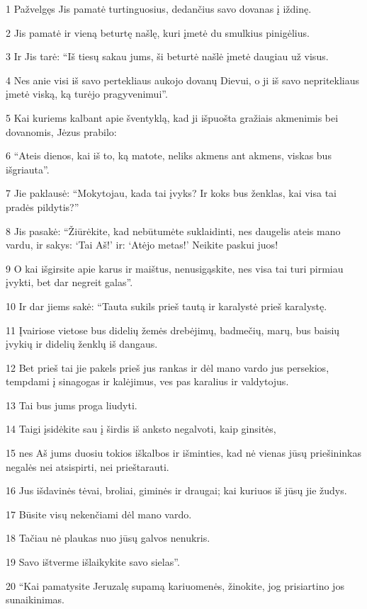 \par 1 Pažvelgęs Jis pamatė turtinguosius, dedančius savo dovanas į iždinę. 
\par 2 Jis pamatė ir vieną beturtę našlę, kuri įmetė du smulkius pinigėlius. 
\par 3 Ir Jis tarė: “Iš tiesų sakau jums, ši beturtė našlė įmetė daugiau už visus. 
\par 4 Nes anie visi iš savo pertekliaus aukojo dovanų Dievui, o ji iš savo nepritekliaus įmetė viską, ką turėjo pragyvenimui”. 
\par 5 Kai kuriems kalbant apie šventyklą, kad ji išpuošta gražiais akmenimis bei dovanomis, Jėzus prabilo: 
\par 6 “Ateis dienos, kai iš to, ką matote, neliks akmens ant akmens, viskas bus išgriauta”. 
\par 7 Jie paklausė: “Mokytojau, kada tai įvyks? Ir koks bus ženklas, kai visa tai pradės pildytis?” 
\par 8 Jis pasakė: “Žiūrėkite, kad nebūtumėte suklaidinti, nes daugelis ateis mano vardu, ir sakys: ‘Tai Aš!’ ir: ‘Atėjo metas!’ Neikite paskui juos! 
\par 9 O kai išgirsite apie karus ir maištus, nenusigąskite, nes visa tai turi pirmiau įvykti, bet dar negreit galas”. 
\par 10 Ir dar jiems sakė: “Tauta sukils prieš tautą ir karalystė prieš karalystę. 
\par 11 Įvairiose vietose bus didelių žemės drebėjimų, badmečių, marų, bus baisių įvykių ir didelių ženklų iš dangaus. 
\par 12 Bet prieš tai jie pakels prieš jus rankas ir dėl mano vardo jus persekios, tempdami į sinagogas ir kalėjimus, ves pas karalius ir valdytojus. 
\par 13 Tai bus jums proga liudyti. 
\par 14 Taigi įsidėkite sau į širdis iš anksto negalvoti, kaip ginsitės, 
\par 15 nes Aš jums duosiu tokios iškalbos ir išminties, kad nė vienas jūsų priešininkas negalės nei atsispirti, nei prieštarauti. 
\par 16 Jus išdavinės tėvai, broliai, giminės ir draugai; kai kuriuos iš jūsų jie žudys. 
\par 17 Būsite visų nekenčiami dėl mano vardo. 
\par 18 Tačiau nė plaukas nuo jūsų galvos nenukris. 
\par 19 Savo ištverme išlaikykite savo sielas”. 
\par 20 “Kai pamatysite Jeruzalę supamą kariuomenės, žinokite, jog prisiartino jos sunaikinimas. 
